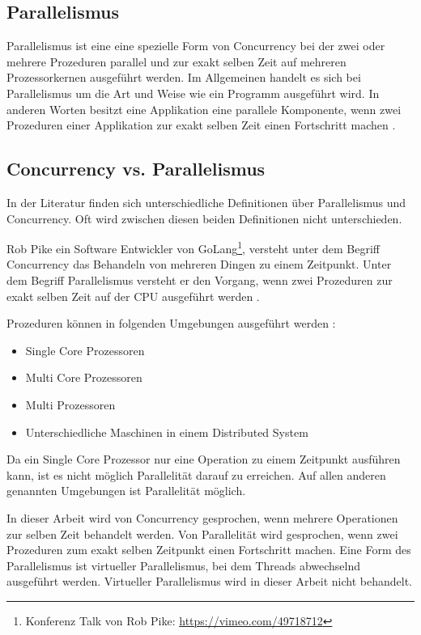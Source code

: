 \subsection{Parallelismus}

Parallelismus ist eine eine spezielle Form von Concurrency bei der zwei oder mehrere Prozeduren parallel und  zur exakt selben Zeit auf mehreren Prozessorkernen ausgeführt werden. Im Allgemeinen handelt es sich bei Parallelismus um die Art und Weise wie ein Programm ausgeführt wird. In anderen Worten besitzt eine Applikation eine parallele Komponente, wenn zwei Prozeduren einer Applikation zur exakt selben Zeit einen Fortschritt machen \cite[]{oracle:multithreading}.

\subsection{Concurrency vs. Parallelismus}

In der Literatur finden sich unterschiedliche Definitionen über Parallelismus und Concurrency. Oft wird zwischen diesen beiden Definitionen nicht unterschieden. 

Rob Pike ein Software Entwickler von GoLang\footnote{Konferenz Talk von Rob Pike: \url{https://vimeo.com/49718712}}, versteht unter dem Begriff Concurrency das Behandeln von mehreren Dingen zu einem Zeitpunkt. Unter dem Begriff Parallelismus versteht er den Vorgang, wenn zwei Prozeduren zur exakt selben Zeit auf der CPU ausgeführt werden \cite[]{Pik2013}.

Prozeduren können in folgenden Umgebungen ausgeführt werden \cite[p. 14]{Erb2012}:

\begin{itemize}
  \item Single Core Prozessoren
  \item Multi Core Prozessoren
  \item Multi Prozessoren
  \item Unterschiedliche Maschinen in einem Distributed System
\end{itemize} 

Da ein Single Core Prozessor nur eine Operation zu einem Zeitpunkt ausführen kann, ist es nicht möglich Parallelität darauf zu erreichen. Auf allen anderen genannten Umgebungen ist Parallelität möglich. 

In dieser Arbeit wird von Concurrency gesprochen, wenn mehrere Operationen zur selben Zeit behandelt werden.  Von Parallelität wird gesprochen, wenn zwei Prozeduren zum exakt selben Zeitpunkt einen Fortschritt machen. Eine Form des Parallelismus ist virtueller Parallelismus, bei dem Threads abwechselnd ausgeführt werden. Virtueller Parallelismus wird in dieser Arbeit nicht behandelt. 

